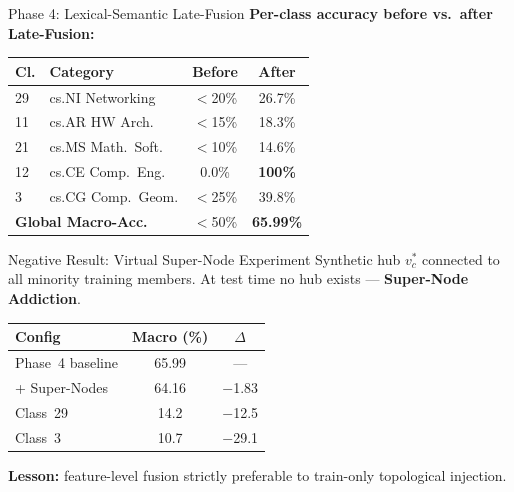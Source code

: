 \documentclass[final]{beamer}
\newlength{\colwidth}
\begin{document}
\begin{frame}[t]
\begin{columns}[t]
\begin{column}{\colwidth}
\begin{block}{Phase 4: Lexical-Semantic Late-Fusion}
    \textbf{Per-class accuracy before vs.\ after Late-Fusion:}
    \begin{center}
    \begin{tabular}{llcc}
      \toprule
      \textbf{Cl.} & \textbf{Category} & \textbf{Before} & \textbf{After}\\
      \midrule
      29 & cs.NI Networking   & $<$20\% & \textcolor{positivegreen}{26.7\%}\\
      11 & cs.AR HW Arch.     & $<$15\% & \textcolor{positivegreen}{18.3\%}\\
      21 & cs.MS Math.\ Soft. & $<$10\% & \textcolor{positivegreen}{14.6\%}\\
      12 & cs.CE Comp.\ Eng.  & 0.0\%   & \textcolor{positivegreen}{\textbf{100\%}}\\
       3 & cs.CG Comp.\ Geom. & $<$25\% & \textcolor{positivegreen}{39.8\%}\\
      \midrule
      \multicolumn{2}{l}{\textbf{Global Macro-Acc.}}
                              & $<$50\% & \textcolor{positivegreen}{\textbf{65.99\%}}\\
      \bottomrule
    \end{tabular}
    \end{center}
  \end{block}

  \begin{block}{Negative Result: Virtual Super-Node Experiment}
    Synthetic hub $v^*_c$ connected to all minority training members.
    At test time no hub exists --- \textbf{Super-Node Addiction}.
    \begin{center}
    \begin{tabular}{lcc}
      \toprule
      \textbf{Config} & \textbf{Macro (\%)} & \textbf{$\Delta$}\\
      \midrule
      Phase~4 baseline & 65.99 & ---\\
      + Super-Nodes    & \textcolor{negativered}{64.16} & \textcolor{negativered}{$-$1.83}\\
      \quad Class~29   & \textcolor{negativered}{14.2}  & \textcolor{negativered}{$-$12.5}\\
      \quad Class~3    & \textcolor{negativered}{10.7}  & \textcolor{negativered}{$-$29.1}\\
      \bottomrule
    \end{tabular}
    \end{center}
    \textbf{Lesson:} feature-level fusion strictly preferable to train-only
    topological injection.
  \end{block}


\end{column}
\end{columns}
\end{frame}
\end{document}
